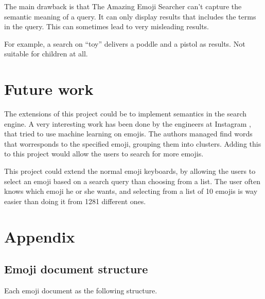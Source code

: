 \documentclass[a4paper]{article}
\begin{document}
The main drawback is that The Amazing Emoji Searcher can't capture the semantic meaning of a query. It can only display results that includes the terms in the query. This can sometimes lead to very misleading results. 

For example, a search on ``toy'' delivers a poddle and a pistol as results. Not suitable for children at all.



\section{Future work} %
\label{sec:future_work}

The extensions of this project could be to implement semantics in the search engine. A very interesting work has been done by the engineers at Instagram \cite{ emoji:2}, that tried to use machine learning on emojis. The authors managed find words that worresponds to the specified emoji, grouping them into clusters. Adding this to this project would allow the users to search for more emojis.

This project could extend the normal emoji keyboards, by allowing the users to select an emoji based on a search query than choosing from a list. The user often knows which emoji he or she wants, and selecting from a list of 10 emojis is way easier than doing it from 1281 different ones.


\pagebreak




\pagebreak

\section*{Appendix}

\subsection*{Emoji document structure} %
\label{sub:emoji_document_structure}

Each emoji document as the following structure.
\end{document}
